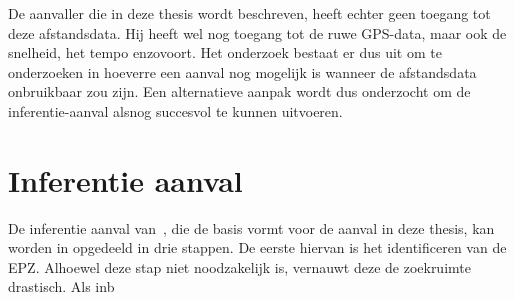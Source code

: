 De aanvaller die in deze thesis wordt beschreven, heeft echter geen toegang tot
deze afstandsdata. Hij heeft wel nog toegang tot de ruwe GPS-data, maar ook de
snelheid, het tempo enzovoort. Het onderzoek bestaat er dus uit om te
onderzoeken in hoeverre een aanval nog mogelijk is wanneer de afstandsdata
onbruikbaar zou zijn. Een alternatieve aanpak wordt dus onderzocht om de
inferentie-aanval alsnog succesvol te kunnen uitvoeren.

\section{Inferentie aanval}\label{sec:inferentieaanval}
De inferentie aanval
van~\citeauthor{Dhondt_Pochat_Voulimeneas_Joosen_Volckaert_2022}, die de basis
vormt voor de aanval in deze thesis, kan worden in opgedeeld in drie stappen.
De eerste hiervan is het identificeren van de \ac{EPZ}. Alhoewel deze stap niet
noodzakelijk is, vernauwt deze de zoekruimte drastisch. Als inb




